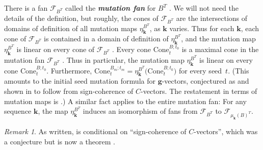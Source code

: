 \documentclass{amsart}
\theoremstyle{definition}
\theoremstyle{remark}
\newtheorem{remark}[proposition]{Remark}
\numberwithin{equation}{section}
\newcommand{\newword}[1]{\textbf{\emph{#1}}}
\newcommand{\F}{{\mathcal F}}
\newcommand{\0}{{\mathbf{0}}}
\newcommand{\Cone}{\mathrm{Cone}}
\newcommand{\g}{\mathbf{g}}
\newcommand{\kk}{\mathbf{k}}
\begin{document}
There is a fan $\F_{B^T}$ called the \newword{mutation fan} for $B^T$ \cite[Definition~5.12]{universal}.
We will not need the details of the definition, but roughly, the cones of $\F_{B^T}$ are the intersections of domains of definition of all mutation maps $\eta_\kk^{B^T}$, as $\kk$ varies.
Thus for each $\kk$, each cone of $\F_{B^T}$ is contained in a domain of definition of $\eta_\kk^{B^T}$, and the mutation map $\eta_\kk^{B^T}$ is linear on every cone of $\F_{B^T}$ \cite[Proposition~5.3]{universal}.
Every cone $\Cone^{B;t_0}_t$ is a maximal cone in the mutation fan $\F_{B^T}$ \cite[Proposition~8.13]{universal}.
Thus in particular, the mutation map $\eta_\kk^{B^T}$ is linear on every cone $\Cone^{B;t_0}_t$.
Furthermore, $\Cone_t^{B_m;t_m}=\eta_\kk^{B^T}\bigl(\Cone_t^{B;t_0}\bigr)$ for every seed~$t$.
(This amounts to the initial seed mutation formula for $\g$-vectors, conjectured as \cite[Conjecture~7.12]{FZ07} and shown in \cite[Proposition~4.2(v)]{NZ12} to follow from sign-coherence of $C$-vectors.
The restatement in terms of mutation maps is \cite[Conjecture~8.11]{universal}.)
A similar fact applies to the entire mutation fan:
For any sequence $\kk$, the map $\eta_\kk^{B^T}$ induces an isomorphism of fans from $\F_{B^T}$ to $\F_{\mu_\kk(B)^T}$.

\begin{remark}\label{conditional}
As written, \cite[Proposition~8.13]{universal} is conditional on ``sign-coherence of $C$-vectors'', which was a conjecture but is now a theorem \cite[Corollary~5.5]{GHKK18}.
\end{remark}
\end{document}
